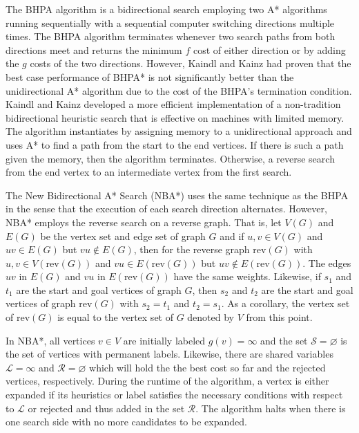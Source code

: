 The BHPA algorithm is a bidirectional search employing two A* algorithms running sequentially with a sequential 
computer switching directions multiple times. The BHPA algorithm terminates whenever two search paths from both directions 
meet and returns the minimum $f$ cost of either direction or by adding the $g$ costs of the two directions.
However, Kaindl and Kainz had proven that the best case performance of BHPA* is not significantly better than 
the unidirectional A* algorithm due to the cost of the BHPA's termination condition.\cite{KainlKainz1997}
Kaindl and Kainz developed a more efficient implementation of a non-tradition bidirectional heuristic search that is effective 
on machines with limited memory. The algorithm instantiates by assigning memory to a unidirectional approach and uses A* to find 
a path from the start to the end vertices. If there is such a path given the memory, then the algorithm terminates. Otherwise, 
a reverse search from the end vertex to an intermediate vertex from the first search.

The New Bidirectional A* Search (NBA*) uses the same technique as the BHPA in the sense that the execution of each search direction alternates.\cite{Pijls2009}
However, NBA* employs the reverse search on a reverse graph. That is, let $V(G)$ and $E(G)$ be the vertex set and edge set of graph $G$ and if $u,v\in V(G)$ and 
$uv\in E(G)$ but $vu\notin E(G)$, then for the reverse graph $\text{rev}(G)$ with $u,v\in V(\text{rev}(G))$ and $vu\in E(\text{rev}(G))$ but $uv\notin E(\text{rev}(G))$.
The edges $uv$ in $E(G)$ and $vu$ in $E(\text{rev}(G))$ have the same weights. Likewise, if $s_1$ and $t_1$ are the start and goal vertices of 
graph $G$, then $s_2$ and $t_2$ are the start and goal vertices of graph $\text{rev}(G)$ with $s_2=t_1$ and $t_2=s_1$. As a corollary, the vertex set of $\text{rev}(G)$
is equal to the vertex set of $G$ denoted by $V$ from this point.

In NBA*, all vertices $v\in V$ are initially labeled $g(v)=\infty$ and the set $\mathcal{S}=\varnothing$ is the set of vertices with
permanent labels. Likewise, there are shared variables $\mathcal{L}=\infty$ and $\mathcal{R}=\varnothing$ which will hold the the 
best cost so far and the rejected vertices, respectively. During the runtime of the algorithm, a vertex is either expanded if its heuristics 
or label satisfies the necessary conditions with respect to $\mathcal{L}$ or rejected and thus added in the set $\mathcal{R}$.
The algorithm halts when there is one search side with no more candidates to be expanded. 



